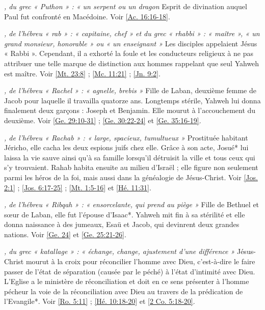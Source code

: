 \begin{multicols}{2}
\textit{, du grec « Puthon » : « un serpent ou un dragon}\newline
Esprit de divination auquel Paul fut confronté en Macédoine. Voir \vref{Ac. 16:16-18}.

\textit{, de l'hébreu « rab » : « capitaine, chef » et du grec « rhabbi » : « maître », « un grand monsieur, honorable » ou « un enseignant »}\newline
Les disciples appelaient Jésus « Rabbi ». Cependant, il a exhorté la foule et les conducteurs religieux à ne pas attribuer une telle marque de distinction aux hommes rappelant que seul Yahweh est maître. Voir \vref{Mt. 23:8} ; \vref{Mc. 11:21} ; \vref{Jn. 9:2}.

\textit{, de l'hébreu « Rachel » : « agnelle, brebis »}\newline
Fille de Laban, deuxième femme de Jacob pour laquelle il travailla quatorze ans. Longtemps stérile, Yahweh lui donna finalement deux garçons : Joseph et Benjamin. Elle mourut à l'accouchement du deuxième. Voir \vref{Ge. 29:10-31} ; \vref{Ge. 30:22-24} et \vref{Ge. 35:16-19}.

\textit{, de l'hébreu « Rachab » : « large, spacieux, tumultueux »}\newline
Prostituée habitant Jéricho, elle cacha les deux espions juifs chez elle. Grâce à son acte, Josué* lui laissa la vie sauve ainsi qu'à sa famille lorsqu'il détruisit la ville et tous ceux qui s'y trouvaient. Rahab habita ensuite au milieu d'Israël ; elle figure non seulement parmi les héros de la foi, mais aussi dans la généalogie de Jésus-Christ. Voir \vref{Jos. 2:1} ; \vref{Jos. 6:17-25} ; \vref{Mt. 1:5-16} et \vref{Hé. 11:31}.

\textit{, de l'hébreu « Ribqah » : « ensorcelante, qui prend au piège »}\newline
Fille de Bethuel et sœur de Laban, elle fut l'épouse d'Isaac*. Yahweh mit fin à sa stérilité et elle donna naissance à des jumeaux, Esaü et Jacob, qui devinrent deux grandes nations. Voir \vref{Ge. 24} et \vref{Ge. 25:21-26}.

\textit{, du grec « katallage » : « échange, change, ajustement d'une différence »}\newline
Jésus-Christ mourut à la croix pour réconcilier l'homme avec Dieu, c'est-à-dire le faire passer de l'état de séparation (causée par le péché) à l'état d'intimité avec Dieu. L'Eglise a le ministère de réconciliation et doit en ce sens présenter à l'homme pécheur la voie de la réconciliation avec Dieu au travers de la prédication de l'Evangile*. Voir \vref{Ro. 5:11} ; \vref{Hé. 10:18-20} et \vref{2 Co. 5:18-20}.


\end{multicols}
